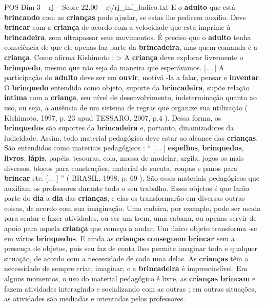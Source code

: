 \begin{textsample}{POS Dim 3 – rj – Score 22.00 – rj/rj\_inf\_ludico.txt}
E o \textbf{adulto} que está \textbf{brincando} com as \textbf{crianças} pode ajudar, se estas lhe pedirem auxílio.
Deve \textbf{brincar} com a \textbf{criança} de acordo com a velocidade que esta imprime à \textbf{brincadeira}, sem ultrapassar seus movimentos.
É preciso que o \textbf{adulto} tenha consciência de que ele apenas faz parte da \textbf{brincadeira}, mas quem comanda é a \textbf{criança}.
Como afirma Kishimoto : > A \textbf{criança} deve explorar livremente o \textbf{brinquedo}, mesmo que não seja da maneira que esperávamos. [... ] A participação do \textbf{adulto} deve ser em \textbf{ouvir}, motivá -la a falar, pensar e \textbf{inventar}.
O \textbf{brinquedo} entendido como objeto, suporte da \textbf{brincadeira}, supõe relação \textbf{íntima} com a \textbf{criança}, seu nível de desenvolvimento, indeterminação quanto ao uso, ou seja, a ausência de um sistema de regras que organize sua utilização ( Kishimoto, 1997, p. 23 apud TESSARO, 2007, p.4 ).
Dessa forma, os \textbf{brinquedos} são suportes da \textbf{brincadeira} e, portanto, dinamizadores da ludicidade.
Assim, todo material pedagógico deve estar ao alcance das \textbf{crianças}.
São entendidos como materiais pedagógicos : “ [... ] \textbf{espelhos}, \textbf{brinquedos}, \textbf{livros}, \textbf{lápis}, papéis, tesouras, cola, massa de modelar, argila, jogos os mais diversos, blocos para construções, material de sucata, roupas e panos para \textbf{brincar} etc. [... ] ” ( BRASIL, 1998, p. 69 ).
São esses materiais pedagógicos que auxiliam os professores durante todo o seu trabalho.
Esses objetos é que farão parte do \textbf{dia} a \textbf{dia} das \textbf{crianças}, e elas os transformarão em diversas outras coisas, de acordo com sua imaginação.
Uma cadeira, por exemplo, pode ser usada para sentar e fazer atividades, ou ser um trem, uma cabana, ou apenas servir de apoio para aquela \textbf{criança} que começa a andar.
Um único objeto transforma -se em vários \textbf{brinquedos}.
E ainda as \textbf{crianças} \textbf{conseguem} \textbf{brincar} sem a presença de objetos, pois seu faz de conta lhes permite imaginar toda e qualquer situação, de acordo com a necessidade de cada uma delas.
As \textbf{crianças} têm a necessidade de sempre criar, imaginar, e a \textbf{brincadeira} é imprescindível.
Em alguns momentos, o uso do material pedagógico é livre, as \textbf{crianças} \textbf{brincam} e fazem atividades interagindo e socializando com as outras ; em outras situações, as atividades são mediadas e orientadas pelos professores.

\end{textsample}
